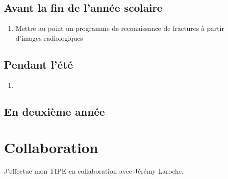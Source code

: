\documentclass{article}
\begin{document}
\subsection{Avant la fin de l'année scolaire}

\begin{enumerate}
	\item Mettre au point un programme de reconaissance de fractures à partir d'images radiologiques
\end{enumerate}

\subsection{Pendant l'été}

\begin{enumerate}
	\item 
\end{enumerate}

\subsection{En deuxième année}

\section{Collaboration}

J'effectue mon TIPE en collaboration avec Jérémy Laroche. 
\end{document}
